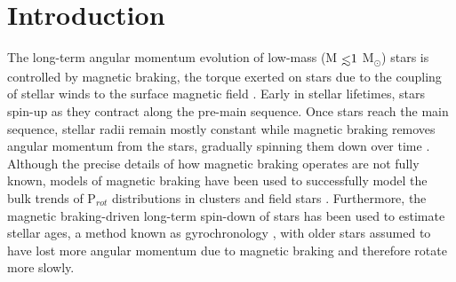 

\section{Introduction} \label{sync:sec:intro}

The long-term angular momentum evolution of low-mass (M$\lsim 1$ M$_{\odot}$) stars is controlled by magnetic braking, the torque exerted on stars due to the coupling of stellar winds to the surface magnetic field \citep{Mestel1968}. Early in stellar lifetimes, stars spin-up as they contract along the pre-main sequence.  Once stars reach the main sequence, stellar radii remain mostly constant while magnetic braking removes angular momentum from the stars, gradually spinning them down over time \citep{Skumanich1972}. Although the precise details of how magnetic braking operates are not fully known, models of magnetic braking have been used to successfully model the bulk trends of P$_{rot}$ distributions in clusters \citep[e.g. Praesepe, ][]{Reiners2012,Matt2015,Douglas2017} and field stars \citep[e.g. the \kepler field, ][]{Matt2015,vanSaders2018}. Furthermore, the magnetic braking-driven long-term spin-down of stars has been used to estimate stellar ages, a method known as gyrochronology \citep{Skumanich1972,Barnes2003,Barnes2007,Mamajek2008,Barnes2010}, with older stars assumed to have lost more angular momentum due to magnetic braking and therefore rotate more slowly.

